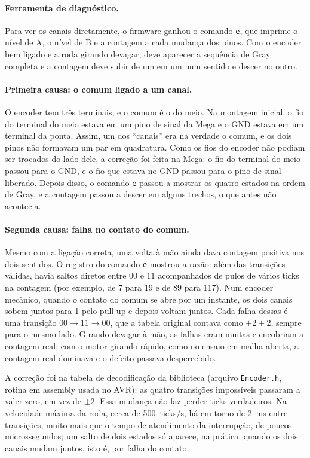 \documentclass[12pt]{article}
\begin{document}
\paragraph{Ferramenta de diagnóstico.} Para ver os canais diretamente, o firmware ganhou o comando \texttt{e}, que imprime o nível de A, o nível de B e a contagem a cada mudança dos pinos. Com o encoder bem ligado e a roda girando devagar, deve aparecer a sequência de Gray completa e a contagem deve subir de um em um num sentido e descer no outro.

\paragraph{Primeira causa: o comum ligado a um canal.} O encoder tem três terminais, e o comum é o do meio. Na montagem inicial, o fio do terminal do meio estava em um pino de sinal da Mega e o GND estava em um terminal da ponta. Assim, um dos ``canais'' era na verdade o comum, e os dois pinos não formavam um par em quadratura. Como os fios do encoder não podiam ser trocados do lado dele, a correção foi feita na Mega: o fio do terminal do meio passou para o GND, e o fio que estava no GND passou para o pino de sinal liberado. Depois disso, o comando \texttt{e} passou a mostrar os quatro estados na ordem de Gray, e a contagem passou a descer em alguns trechos, o que antes não acontecia.

\paragraph{Segunda causa: falha no contato do comum.} Mesmo com a ligação correta, uma volta à mão ainda dava contagem positiva nos dois sentidos. O registro do comando \texttt{e} mostrou a razão: além das transições válidas, havia saltos diretos entre $00$ e $11$ acompanhados de pulos de vários ticks na contagem (por exemplo, de 7 para 19 e de 89 para 117). Num encoder mecânico, quando o contato do comum se abre por um instante, os dois canais sobem juntos para 1 pelo pull-up e depois voltam juntos. Cada falha dessas é uma transição $00 \to 11 \to 00$, que a tabela original contava como $+2+2$, sempre para o mesmo lado. Girando devagar à mão, as falhas eram muitas e encobriam a contagem real; com o motor girando rápido, como no ensaio em malha aberta, a contagem real dominava e o defeito passava despercebido.

A correção foi na tabela de decodificação da biblioteca (arquivo \texttt{Encoder.h}, rotina em assembly usada no AVR): as quatro transições impossíveis passaram a valer zero, em vez de $\pm 2$. Essa mudança não faz perder ticks verdadeiros. Na velocidade máxima da roda, cerca de 500~ticks/s, há em torno de \SI{2}{\milli\second} entre transições, muito mais que o tempo de atendimento da interrupção, de poucos microssegundos; um salto de dois estados só aparece, na prática, quando os dois canais mudam juntos, isto é, por falha do contato.
\end{document}
